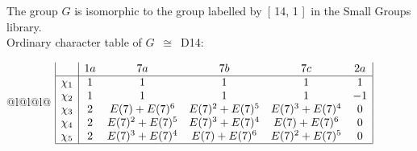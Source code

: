\documentclass[varwidth=\maxdimen,border=10]{standalone}
\begin{document}
The group $G$ is isomorphic to the group labelled by\ [ 14, 1 ]\ in the Small Groups library.\\
Ordinary character table of $G$\ $\cong$\ D14:\\
\begin{center}
\begin{tabular}{@{}l@{}l@{}l@{}}
\hline
\(\begin{array}{|l|ccccc|}
  & 1a & 7a & 7b & 7c & 2a\\ \hline
\chi_{1} & 1 & 1 & 1 & 1 & 1\\
\chi_{2} & 1 & 1 & 1 & 1 & -1\\
\chi_{3} & 2 & E(7)+E(7)^{6} & E(7)^{2}+E(7)^{5} & E(7)^{3}+E(7)^{4} & 0\\
\chi_{4} & 2 & E(7)^{2}+E(7)^{5} & E(7)^{3}+E(7)^{4} & E(7)+E(7)^{6} & 0\\
\chi_{5} & 2 & E(7)^{3}+E(7)^{4} & E(7)+E(7)^{6} & E(7)^{2}+E(7)^{5} & 0\\
\hline
\end{array}\)\\
\end{tabular}
\end{center}
\end{document}
